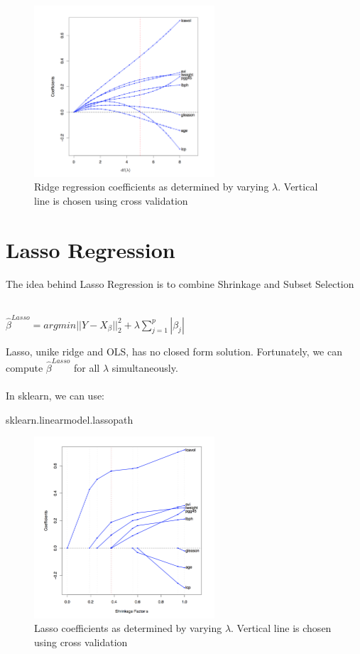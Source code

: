 \documentclass[a4paper]{article}
\begin{document}
\begin{figure}[H] 
\centering
\includegraphics[width=0.6\textwidth]{ridge_regression2.png}
\caption{Ridge regression coefficients as determined by varying $\lambda$. Vertical line is chosen using cross validation}
\end{figure}

\section{Lasso Regression}
The idea behind Lasso Regression is to combine Shrinkage and Subset Selection
\\
\\
\begin{center}
  $\hat{\beta}^{Lasso} = argmin||Y-X_{\beta}||_2^2 + \lambda \sum\limits_{j=1}^{p} |\beta_{j}|$
\end{center}
Lasso, unike ridge and OLS, has no closed form solution. Fortunately, we can compute $\hat{\beta}^{Lasso}$ for all $\lambda$ simultaneously.
\\
\\
In sklearn, we can use:
\begin{center}
	sklearn.linear\textunderscore model.lasso\textunderscore path
\end{center}

\begin{figure}[H]
\centering
\includegraphics[width=0.6\textwidth]{lasso.png}
\caption{Lasso coefficients as determined by varying $\lambda$. Vertical line is chosen using cross validation}
\end{figure}
\end{document}
